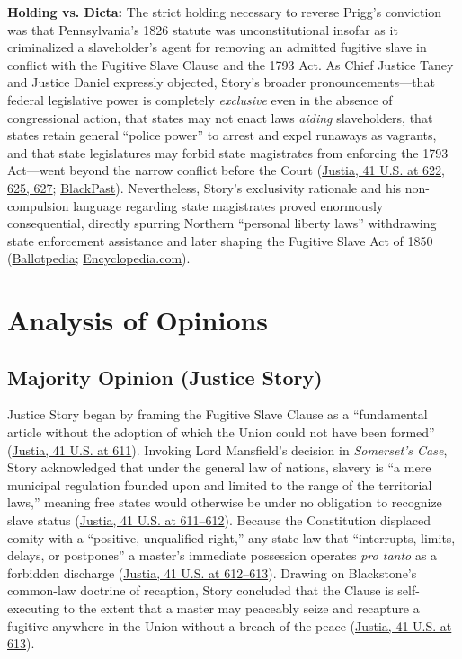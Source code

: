 \documentclass[12pt]{article}
\begin{document}
\textbf{Holding vs. Dicta:} The strict holding necessary to reverse Prigg's conviction was that Pennsylvania's 1826 statute was unconstitutional insofar as it criminalized a slaveholder's agent for removing an admitted fugitive slave in conflict with the Fugitive Slave Clause and the 1793 Act. As Chief Justice Taney and Justice Daniel expressly objected, Story's broader pronouncements---that federal legislative power is completely \textit{exclusive} even in the absence of congressional action, that states may not enact laws \textit{aiding} slaveholders, that states retain general ``police power'' to arrest and expel runaways as vagrants, and that state legislatures may forbid state magistrates from enforcing the 1793 Act---went beyond the narrow conflict before the Court (\href{https://supreme.justia.com/cases/federal/us/41/539/}{Justia, 41 U.S. at 622, 625, 627}; \href{https://blackpast.org/african-american-history/prigg-v-pennsylvania-1842/}{BlackPast}). Nevertheless, Story's exclusivity rationale and his non-compulsion language regarding state magistrates proved enormously consequential, directly spurring Northern ``personal liberty laws'' withdrawing state enforcement assistance and later shaping the Fugitive Slave Act of 1850 (\href{https://ballotpedia.org/Prigg_v._Pennsylvania}{Ballotpedia}; \href{https://www.encyclopedia.com/history/dictionaries-thesauruses-pictures-and-press-releases/prigg-v-commonwealth-pennsylvania}{Encyclopedia.com}).

\section{Analysis of Opinions}

\subsection{Majority Opinion (Justice Story)}
Justice Story began by framing the Fugitive Slave Clause as a ``fundamental article without the adoption of which the Union could not have been formed'' (\href{https://supreme.justia.com/cases/federal/us/41/539/}{Justia, 41 U.S. at 611}). Invoking Lord Mansfield's decision in \textit{Somerset's Case}, Story acknowledged that under the general law of nations, slavery is ``a mere municipal regulation founded upon and limited to the range of the territorial laws,'' meaning free states would otherwise be under no obligation to recognize slave status (\href{https://supreme.justia.com/cases/federal/us/41/539/}{Justia, 41 U.S. at 611--612}). Because the Constitution displaced comity with a ``positive, unqualified right,'' any state law that ``interrupts, limits, delays, or postpones'' a master's immediate possession operates \textit{pro tanto} as a forbidden discharge (\href{https://supreme.justia.com/cases/federal/us/41/539/}{Justia, 41 U.S. at 612--613}). Drawing on Blackstone's common-law doctrine of recaption, Story concluded that the Clause is self-executing to the extent that a master may peaceably seize and recapture a fugitive anywhere in the Union without a breach of the peace (\href{https://supreme.justia.com/cases/federal/us/41/539/}{Justia, 41 U.S. at 613}).
\end{document}

